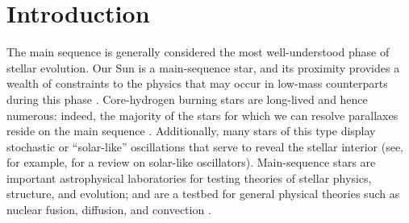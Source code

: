 



\section{Introduction} 

The main sequence is generally considered the most well-understood phase of stellar evolution. 
Our Sun is a main-sequence star, and its proximity provides a wealth of constraints to the physics that may occur in low-mass counterparts during this phase \citep[e.g.,][]{2015SSRv..196...49B,2016lrsp...13....2b}. 
Core-hydrogen burning stars are long-lived and hence numerous: indeed, the majority of the stars for which we can resolve parallaxes reside on the main sequence \citep{2016arXiv160904172G}. 
Additionally, many stars of this type display stochastic or ``solar-like'' oscillations that serve to reveal the stellar interior (see, for example, \citealt{2013ARA&A..51..353C} for a review on solar-like oscillators).  
Main-sequence stars are important astrophysical laboratories for testing theories of stellar physics, structure, and evolution; and are a testbed for general physical theories such as nuclear fusion, diffusion, and convection \citep[e.g.,][]{1994MNRAS.269.1137B,1990ARAA..28..263S}. 

